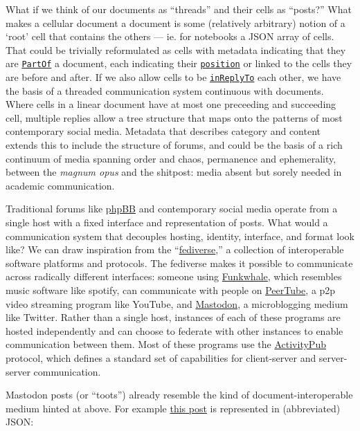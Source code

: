What if we think of our documents as ``threads'' and their cells as
``posts?'' What makes a cellular document a document is some (relatively
arbitrary) notion of a `root' cell that contains the others --- ie. for
notebooks a JSON array of cells. That could be trivially reformulated as
cells with metadata indicating that they are
\href{https://schema.org/isPartOf}{\texttt{PartOf}} a document, each
indicating their \href{https://schema.org/position}{\texttt{position}}
or linked to the cells they are before and after. If we also allow cells
to be
\href{https://www.w3.org/TR/activitystreams-vocabulary/\#dfn-inreplyto}{\texttt{inReplyTo}}
each other, we have the basis of a threaded communication system
continuous with documents. Where cells in a linear document have at most
one preceeding and succeeding cell, multiple replies allow a tree
structure that maps onto the patterns of most contemporary social media.
Metadata that describes category and content extends this to include the
structure of forums, and could be the basis of a rich continuum of media
spanning order and chaos, permanence and ephemerality, between the
\emph{magnum opus} and the shitpost: media absent but sorely needed in
academic communication.

Traditional forums like \href{https://www.phpbb.com/}{phpBB} and
contemporary social media operate from a single host with a fixed
interface and representation of posts. What would a communication system
that decouples hosting, identity, interface, and format look like? We
can draw inspiration from the
``\href{https://en.wikipedia.org/wiki/Fediverse}{fediverse},'' a
collection of interoperable software platforms and protocols. The
fediverse makes it possible to communicate across radically different
interfaces: someone using \href{https://funkwhale.audio/}{Funkwhale},
which resembles music software like spotify, can communicate with people
on \href{https://joinpeertube.org/}{PeerTube}, a p2p video streaming
program like YouTube, and \href{https://joinmastodon.org/}{Mastodon}, a
microblogging medium like Twitter. Rather than a single host, instances
of each of these programs are hosted independently and can choose to
federate with other instances to enable communication between them. Most
of these programs use the
\href{https://www.w3.org/TR/2018/REC-activitypub-20180123/}{ActivityPub}
\citep{Webber:18:A}  protocol, which defines a standard set of
capabilities for client-server and server-server communication.

Mastodon posts (or ``toots'') already resemble the kind of
document-interoperable medium hinted at above. For example
\href{https://web.archive.org/web/20220708215201/https://social.coop/@jonny/107328829457619549}{this
post} is represented in (abbreviated) JSON:

